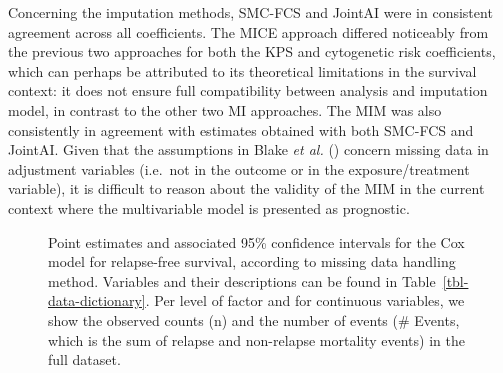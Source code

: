 \documentclass[
  letterpaper,
  DIV=11,
  numbers=noendperiod]{scrreprt}
\begin{document}
Concerning the imputation methods, SMC-FCS and JointAI were in
consistent agreement across all coefficients. The MICE approach differed
noticeably from the previous two approaches for both the KPS and
cytogenetic risk coefficients, which can perhaps be attributed to its
theoretical limitations in the survival context: it does not ensure full
compatibility between analysis and imputation model, in contrast to the
other two MI approaches. The MIM was also consistently in agreement with
estimates obtained with both SMC-FCS and JointAI. Given that the
assumptions in Blake \emph{et al.}
() concern
missing data in adjustment variables (i.e.~not in the outcome or in the
exposure/treatment variable), it is difficult to reason about the
validity of the MIM in the current context where the multivariable model
is presented as prognostic.

\begin{figure}


\caption{\label{fig-forest-efs}Point estimates and associated 95\%
confidence intervals for the Cox model for relapse-free survival,
according to missing data handling method. Variables and their
descriptions can be found in Table~\ref{tbl-data-dictionary}. Per level
of factor and for continuous variables, we show the observed counts (n)
and the number of events (\# Events, which is the sum of relapse and
non-relapse mortality events) in the full dataset.}

\end{figure}%
\end{document}

